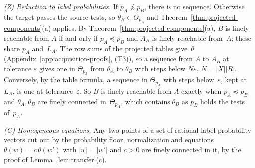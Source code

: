 \emph{(Z) Reduction to label probabilities.} %
If $p_A\npreceq p_B$, there is no sequence. Otherwise the target passes the
source tests, so $\theta_B\in\Theta_{p_A}$ and
Theorem~\ref{thm:projected-components}(a) applies. By
Theorem~\ref{thm:projected-components}(a), $B$ is finely reachable from $A$
if and only if $p_A\preceq p_B$ and $A_B$ is finely reachable from~$A$;
these share $p_A$ and~$L_A$. The row sums of the
projected tables give~$\theta$ (Appendix~\ref{app:acquisition-proofs},
(T3)), so a sequence from $A$ to $A_B$ at tolerance $\varepsilon$ gives one
in $\Theta_{p_A}$ from $\theta_A$ to $\theta_B$ with steps below
$N\varepsilon$, $N=|X||R|$. Conversely, by the table formula, a sequence
in $\Theta_{p_A}$ with steps below~$\varepsilon$, kept at $L_A$, is one at
tolerance~$\varepsilon$. So $B$ is finely reachable from $A$ exactly when
$p_A\preceq p_B$ and $\theta_A,\theta_B$ are finely connected
in~$\Theta_{p_A}$, which contains $\theta_B$ as $p_B$ holds the tests
of~$p_A$.

\emph{(G) Homogeneous equations.} Any two points of a set of rational
label-probability vectors cut out by the probability floor, normalization
and equations $\theta(w)=c\,\theta(w')$ with $|w|=|w'|$ and $c>0$ are
finely connected in it, by the proof of Lemma~\ref{lem:transfer}(c).

